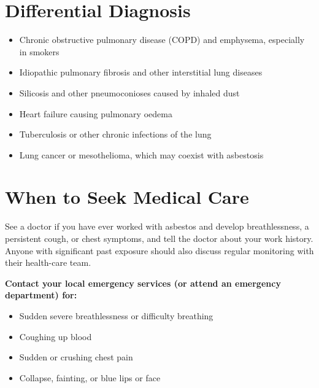 \section*{Differential Diagnosis}
\begin{itemize}
    \item Chronic obstructive pulmonary disease (COPD) and emphysema, especially in smokers
    \item Idiopathic pulmonary fibrosis and other interstitial lung diseases
    \item Silicosis and other pneumoconioses caused by inhaled dust
    \item Heart failure causing pulmonary oedema
    \item Tuberculosis or other chronic infections of the lung
    \item Lung cancer or mesothelioma, which may coexist with asbestosis
\end{itemize}

\section*{When to Seek Medical Care}
See a doctor if you have ever worked with asbestos and develop breathlessness, a persistent cough, or chest symptoms, and tell the doctor about your work history. Anyone with significant past exposure should also discuss regular monitoring with their health-care team.

\textbf{Contact your local emergency services (or attend an emergency department) for:}
\begin{itemize}
    \item Sudden severe breathlessness or difficulty breathing
    \item Coughing up blood
    \item Sudden or crushing chest pain
    \item Collapse, fainting, or blue lips or face
\end{itemize}

